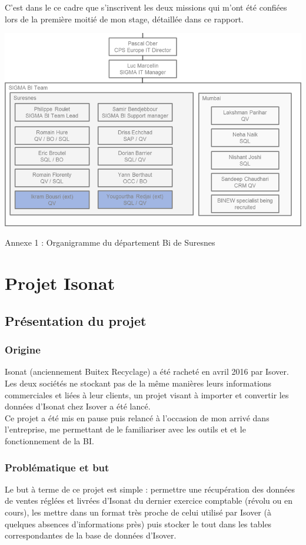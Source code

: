 \documentclass[a4paper,12pt]{article}
\begin{document}
C'est dans le ce cadre que s'inscrivent les deux missions qui m'ont été confiées lors de la première moitié de mon stage, détaillée dans ce rapport.

\begin{center}
    \includegraphics[angle=90, scale=0.9]{illustrations/organigramme-BI}

    Annexe 1 : Organigramme du département Bi de Suresnes
\end{center}



\newpage
\section{Projet Isonat}
\subsection{Présentation du projet}
\subsubsection{Origine}
Isonat (anciennement Buitex Recyclage) a été racheté en avril 2016 par Isover. Les deux sociétés ne stockant pas de la même manières leurs informations commerciales et liées à leur clients, un projet visant à importer et convertir les données d'Isonat chez Isover a été lancé.\\

Ce projet a été mis en pause puis relancé à l'occasion de mon arrivé dans l'entreprise, me permettant de le familiariser avec les outils et et le fonctionnement de la BI.


\subsubsection{Problématique et but}
Le but à terme de ce projet est simple : permettre une récupération des données de ventes réglées et livrées d'Isonat du dernier exercice comptable (révolu ou en cours), les mettre dans un format très proche de celui utilisé par Isover (à quelques absences d'informations près) puis stocker le tout dans les tables correspondantes de la base de données d'Isover.\\
\end{document}
